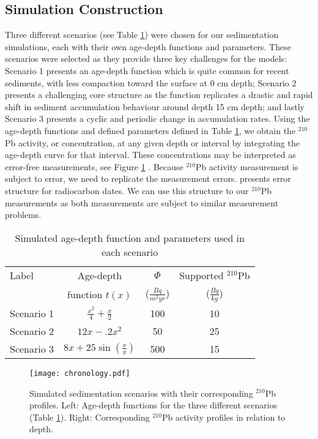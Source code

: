 \documentclass [10pt] {article}
\begin{document}
\subsection{Simulation Construction}\label{sec:SimConst}

Three different scenarios (see Table \ref{tab:sim_param}) were chosen for our sedimentation simulations, each with their own age-depth functions and parameters. 
These scenarios were selected as they provide three key challenges for the models: Scenario 1 presents an age-depth function which is quite common for recent sediments, with less compaction toward the surface at 0 cm depth; Scenario 2 presents a challenging core structure as the function replicates a drastic and rapid shift in sediment accumulation behaviour around depth 15 cm depth; and lastly Scenario 3 presents a cyclic and periodic change in accumulation rates. 
Using the age-depth functions and defined parameters defined in Table \ref{tab:sim_param}, we obtain the $^{210}$Pb activity, or concentration, at any given depth or interval by integrating the age-depth curve for that interval.  
These concentrations may be interpreted as error-free measurements, 
see Figure \ref{fig:true_210} . 
Because $^{210}$Pb activity measurement is subject to error, we need to replicate the measurement errors. 
\citet{Blaauw2018} presents error structure for radiocarbon dates. 
We can use this structure to our $^{210}$Pb measurements as both measurements are subject to similar measurement problems. 


\begin{table}[!h]
	\centering
	\begin{tabular}{l|ccc}
Label    	& 	Age-depth		&	$ \Phi$		& Supported $^{210}$Pb  \\
		&	function $t(x)$		&	($\frac{Bq}{m^2yr }$)	& ($\frac{Bq}{kg}$) 	\\ \hline
Scenario 1 	&	$\frac{x^2}{4} + \frac{x}{2}$	&	100	& 10	\\
Scenario 2 	&	$12x -.2x^2$			&	50	& 25	\\
Scenario 3 	&	$8x+25\sin(\frac{x}{\pi})$	&	500 	& 15		
	\end{tabular}
	\label{tab:sim_param}
	\caption{Simulated age-depth function and parameters used in each scenario}
 \end{table}

\begin{figure}[!h]
 \centering
  \texttt{[image: chronology.pdf]}
	\caption{Simulated sedimentation scenarios with their corresponding $^{210}$Pb profiles. Left: Age-depth functions for the three different scenarios (Table \ref{tab:sim_param}). Right: Corresponding $^{210}$Pb activity profiles in relation to depth.}
  \label{fig:true_210}
\end{figure}
\end{document}
